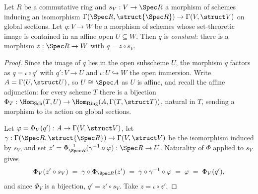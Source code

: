 \begin{lemma}[Constancy]
  \label{lem:constant_into_affine}
  \leanok
  Let \(R\) be a commutative ring and \(s_V : V \to \Spec R\) a morphism of schemes inducing
  an isomorphism \(\Gamma(\Spec R, \struct{\Spec R}) \to \Gamma(V, \struct V)\) on global
  sections. Let \(q : V \to W\) be a morphism of schemes whose set-theoretic image is
  contained in an affine open \(U \subseteq W\). Then \(q\) is \emph{constant}: there is a
  morphism \(z : \Spec R \to W\) with \(q = z \circ s_V\).
\end{lemma}
\begin{proof}
  \leanok
  Since the image of \(q\) lies in the open subscheme \(U\), the morphism \(q\) factors as
  \(q = \iota \circ q'\) with \(q' : V \to U\) and \(\iota : U \hookrightarrow W\) the open
  immersion. Write \(A = \Gamma(U, \struct U)\), so \(U \cong \Spec A\) as \(U\) is affine,
  and recall the affine adjunction: for every scheme \(T\) there is a bijection
  \(\Phi_T : \Hom_{\mathrm{Sch}}(T, U) \to \Hom_{\mathrm{Ring}}(A, \Gamma(T, \struct T))\),
  natural in \(T\), sending a morphism to its action on global sections.

  Let \(\varphi = \Phi_V(q') : A \to \Gamma(V, \struct V)\), let
  \(\gamma : \Gamma(\Spec R, \struct{\Spec R}) \to \Gamma(V, \struct V)\) be the isomorphism
  induced by \(s_V\), and set
  \(z' = \Phi_{\Spec R}^{-1}(\gamma^{-1} \circ \varphi) : \Spec R \to U\). Naturality of
  \(\Phi\) applied to \(s_V\) gives
  \[
    \Phi_V(z' \circ s_V) \;=\; \gamma \circ \Phi_{\Spec R}(z')
      \;=\; \gamma \circ \gamma^{-1} \circ \varphi \;=\; \varphi \;=\; \Phi_V(q'),
  \]
  and since \(\Phi_V\) is a bijection, \(q' = z' \circ s_V\). Take \(z = \iota \circ z'\).
\end{proof}

